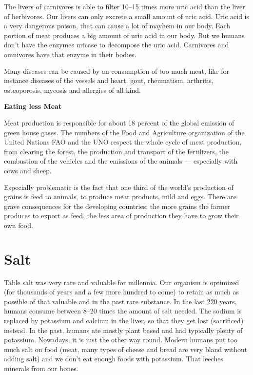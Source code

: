 \documentclass[../main.tex]{subfiles}
\begin{document}
The livers of carnivores is able to filter 10--15 times more uric acid than the liver of herbivores.
Our livers can only excrete a small amount of uric acid.
Uric acid is a very dangerous poison, that can cause a lot of mayhem in our body.
Each portion of meat produces a big amount of uric acid in our body.
But we humans don't have the enzymes uricase to decompose the uric acid.
Carnivores and omnivores have that enzyme in their bodies.

Many diseases can be caused by an consumption of too much meat,
like for instance diseases of the vessels and heart,
gout, rheumatism, arthritis, osteoporosis,
mycosis and allergies of all kind.


 
\vspace{5mm}
\noindent
\begin{fminipage}{\textwidth}
  \textbf{Eating less Meat}

  Meat production is responsible for about 18 percent of the global emission of green house gases.
  The numbers of the Food and Agriculture organization of the United Nations FAO and the UNO respect the whole
  cycle of meat production, from clearing the forest, the production and transport of the fertilizers,
  the combustion of the vehicles and the emissions of the animals --- especially with cows and sheep.

  Especially problematic is the fact that one third of the world's production of grains is feed to animals,
  to produce meat products, mild and eggs.
  There are grave consequences for the developing countries: the more grains the farmer produces to export as feed,
  the less area of production they have to grow their own food\cite{pressetext}.
\end{fminipage}


\section{Salt}

Table salt was very rare and valuable for millennia.
Our organism is optimized (for thousands of years and a few more hundred to come)  to retain as much as possible of that valuable and in the past rare substance.
In the last 220 years, humans consume between 8--20 times the amount of salt needed.
The sodium is replaced by potassium and calcium in the liver,  so that they get lost (sacrificed) instead.
In the past, humans ate mostly plant based and had typically plenty of potassium.
Nowadays, it is just the other way round.
Modern humans put too much salt on food (meat, many types of cheese and bread are very bland without adding salt)
and we don't eat enough foods with potassium.
That leeches minerals from our bones.
\end{document}
